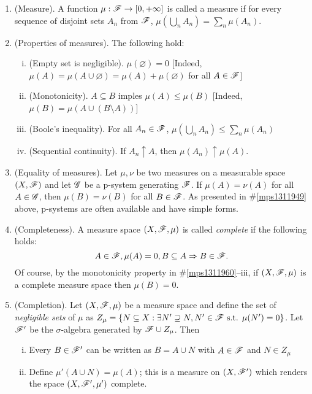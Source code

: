 \documentclass[a4paper,10pt]{article}
\begin{document}
\begin{enumerate}
 \item (Measure). A function $\mu: \mathscr{F}\to [0,+\infty]$ is called a measure if 
       for every sequence of disjoint sets $A_n$ from $\mathscr{F}$, $\mu(\bigcup_n A_n)= \sum_n \mu(A_n)$.

 \item \label{mps1311960}
      (Properties of measures). The following hold:
      \begin{enumerate}[(i)]
       \item (Empty set is negligible). $\mu(\varnothing)=0$ [Indeed, $\mu(A) = \mu(A\cup \varnothing) = \mu(A) + \mu(\varnothing)$ for all $A\in\mathscr{F}$]
       \item (Monotonicity). $A\subseteq B$ imples $\mu(A) \leq \mu(B)$ [Indeed, $\mu(B) = \mu(A\cup (B\setminus A))$]
       \item (Boole's inequality). For all $A_n\in\mathscr{F}$, $\mu(\bigcup_n A_n) \leq \sum_n \mu(A_n)$
       \item (Sequential continuity). If $A_n\uparrow A$, then $\mu(A_n)\uparrow \mu(A)$.
      \end{enumerate}

 \item (Equality of measures). Let $\mu,\nu$ be two measures on a measurable space $(X,\mathscr{F})$ and let $\mathscr{G}$ 
       be a p-system generating $\mathscr{F}$. If $\mu(A) = \nu(A)$ for all $A\in \mathscr{G}$, then $\mu(B) = \nu(B)$
       for all $B\in\mathscr{F}$. As presented in \#\ref{mps1311949} above, p-systems are often available and 
       have simple forms.
      
 \item (Completeness). A measure space $(X,\mathscr{F},\mu)$ is called \textit{complete} if the following holds:
	\[
	    A \in \mathscr{F}, \mu(A)=0, B\subseteq A \Rightarrow B \in \mathscr{F}.
	\]
       Of course, by the monotonicity property in \#\ref{mps1311960}--iii, if $(X,\mathscr{F},\mu)$ is a complete 
       measure space then $\mu(B) = 0$.
       
 \item (Completion). Let $(X,\mathscr{F},\mu)$ be a measure space and define the set of \textit{negligible sets} of $\mu$ as 
       $Z_\mu = \{N \subseteq X: \exists N'\supseteq N, N'\in\mathscr{F} \text{ s.t. } \mu(N')=0\}$.
       Let $\mathscr{F}'$ be the $\sigma$-algebra generated by $\mathscr{F}\cup Z_\mu$. Then
       \begin{enumerate}[(i)]
        \item Every $B\in\mathscr{F}'$ can be written as $B=A\cup N$ with $A\in\mathscr{F}$ and $N\in Z_\mu$
        \item Define $\mu'(A\cup N) = \mu(A)$; this is a measure on $(X,\mathscr{F}')$ which renders 
              the space $(X,\mathscr{F}',\mu')$ complete. 
       \end{enumerate}
 

\end{enumerate}
\end{document}
